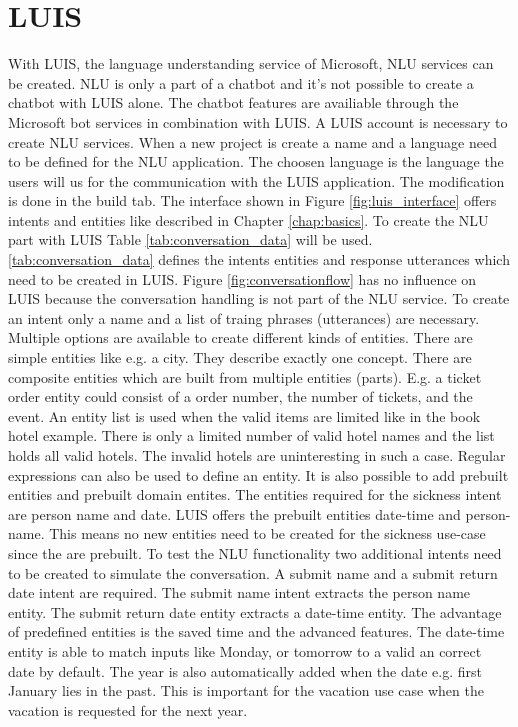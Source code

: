 \section{LUIS}
With LUIS\cite{luisdocs}, the language understanding service of Microsoft,
NLU services can be created.
NLU is only a part of a chatbot and it's not possible 
to create a chatbot with LUIS alone.
The chatbot features are availiable through the Microsoft bot services 
in combination with LUIS.
A LUIS account is necessary to create NLU services.
When a new project is create a name and a language need to be defined for 
the NLU application.
The choosen language is the language the users will us for the communication with the 
LUIS application.
The modification is done in the build tab.
The interface shown in Figure \ref{fig:luis_interface} offers intents and entities
like described in Chapter \ref{chap:basics}.
To create the NLU part with LUIS Table \ref{tab:conversation_data} will be used.
\ref{tab:conversation_data} defines the intents entities and response utterances
which need to be created in LUIS.
Figure \ref{fig:conversationflow} has no influence on LUIS because the 
conversation handling is not part of the NLU service.
To create an intent only a name and a list of traing phrases (utterances) are necessary.
Multiple options are available to create different kinds of entities.
There are simple entities like e.g. a city.
They describe exactly one concept.
There are composite entities which are built from multiple entities (parts).
E.g. a ticket order entity could consist of a order number, the number of 
tickets, and the event.
An entity list is used when the valid items are limited like in the book hotel example.
There is only a limited number of valid hotel names and the list holds all valid 
hotels.
The invalid hotels are uninteresting in such a case.
Regular expressions\cite{regex} can also be used to define an entity.
It is also possible to add prebuilt entities and prebuilt domain entites.
The entities required for the sickness intent are person name and date. 
LUIS offers the prebuilt entities date-time and person-name.
This means no new entities need to be created for the sickness use-case
since the are prebuilt.
To test the NLU functionality two additional intents need to be created to 
simulate the conversation.
A submit name and a submit return date intent are required.
The submit name intent extracts the person name entity.
The submit return date entity extracts a date-time entity.
The advantage of predefined entities is the saved time and the 
advanced features.
The date-time entity is able to match inputs like Monday, or tomorrow to 
a valid an correct date by default.
The year is also automatically added when the date e.g. first January lies in the past.
This is important for the vacation use case when the vacation is requested for 
the next year. 


